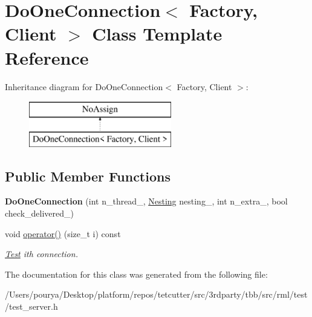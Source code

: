 \hypertarget{classDoOneConnection}{}\section{Do\+One\+Connection$<$ Factory, Client $>$ Class Template Reference}
\label{classDoOneConnection}
Inheritance diagram for Do\+One\+Connection$<$ Factory, Client $>$\+:\begin{figure}[H]
\begin{center}
\leavevmode
\includegraphics[height=2.000000cm]{classDoOneConnection}
\end{center}
\end{figure}
\subsection*{Public Member Functions}
\begin{DoxyCompactItemize}
\item 
\hypertarget{classDoOneConnection_a18403131d68f337317135ad07f0da5bc}{}{\bfseries Do\+One\+Connection} (int n\+\_\+thread\+\_\+, \hyperlink{structNesting}{Nesting} nesting\+\_\+, int n\+\_\+extra\+\_\+, bool check\+\_\+delivered\+\_\+)\label{classDoOneConnection_a18403131d68f337317135ad07f0da5bc}

\item 
\hypertarget{classDoOneConnection_ae821a71eb1a8330acce57fd0d32cc25e}{}void \hyperlink{classDoOneConnection_ae821a71eb1a8330acce57fd0d32cc25e}{operator()} (size\+\_\+t i) const \label{classDoOneConnection_ae821a71eb1a8330acce57fd0d32cc25e}

\begin{DoxyCompactList}\small\item\em \hyperlink{classTest}{Test} ith connection. \end{DoxyCompactList}\end{DoxyCompactItemize}


The documentation for this class was generated from the following file\+:\begin{DoxyCompactItemize}
\item 
/\+Users/pourya/\+Desktop/platform/repos/tetcutter/src/3rdparty/tbb/src/rml/test/test\+\_\+server.\+h\end{DoxyCompactItemize}
